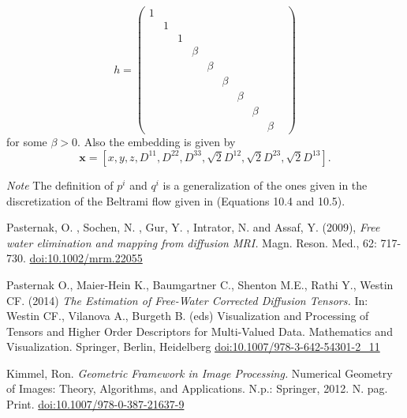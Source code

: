 \documentclass[12pt]{article}
\newcommand{\vect}[1]{\mathbf{#1}}
\begin{document}
$$
h = 
\begin{pmatrix}
1 & & & & & & & & \\
 & 1 & & & & & & & \\
 & & 1 & & & & & & \\
 & & & \beta & & & & & \\
 & & & & \beta & & & & \\
 & & & & & \beta & & & \\
 & & & & & & \beta & & \\
 & & & & & & & \beta & \\
 & & & & & & & & \beta & 
\end{pmatrix}
$$
for some $\beta > 0$. Also the embedding is given by 
$$ \vect{x} = [x, y, z, D^{1 1}, D^{2 2}, D^{3 3}, \sqrt{2} D^{1 2}, \sqrt{2}
D^{2 3}, \sqrt{2} D^{1 3}].$$


\textit{Note}
The definition of $p^i$ and $q^i$ is a generalization of the ones given in the
discretization of the Beltrami flow given in \cite{Kimmel} (Equations 10.4 and
10.5).

\begin{thebibliography}{9}
         Pasternak, O. , Sochen, N. ,
                Gur, Y. , Intrator, N. and Assaf, Y. (2009), \textit{Free water
                elimination and mapping from diffusion MRI.} Magn. Reson.
                Med., 62: 717-730.
                \href{https://doi.org/10.1002/mrm.22055}{doi:10.1002/mrm.22055}

         Pasternak O., Maier-Hein K.,
                Baumgartner C., Shenton M.E., Rathi Y., Westin CF.  (2014)
                \textit{The Estimation of Free-Water Corrected Diffusion
                Tensors.} In: Westin CF., Vilanova A., Burgeth B. (eds)
                Visualization and Processing of Tensors and Higher Order
                Descriptors for Multi-Valued Data. Mathematics and
                Visualization.  Springer, Berlin, Heidelberg
                \href{https://doi.org/10.1007/978-3-642-54301-2\_11}{doi:10.1007/978-3-642-54301-2\_11}

         Kimmel, Ron. \textit{Geometric Framework in
                Image Processing.} Numerical Geometry of Images: Theory,
                Algorithms, and Applications. N.p.: Springer, 2012. N. pag.
                Print.
                \href{https://doi.org/10.1007/978-0-387-21637-9}{doi:10.1007/978-0-387-21637-9}

\end{thebibliography}
\end{document}

